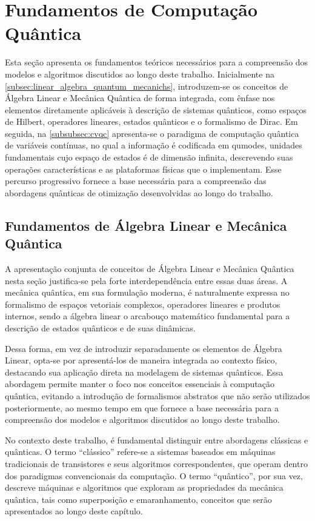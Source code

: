 \chapter{Fundamentos de Computação Quântica}\label{sec:quantum_mechanics}

Esta seção apresenta os fundamentos teóricos necessários para a compreensão dos modelos e algoritmos discutidos ao longo deste trabalho. Inicialmente na \autoref{subsec:linear_algebra_quantum_mecanichs}, introduzem-se os conceitos de Álgebra Linear e Mecânica Quântica de forma integrada, com ênfase nos elementos diretamente aplicáveis à descrição de sistemas quânticos, como espaços de Hilbert, operadores lineares, estados quânticos e o formalismo de Dirac. Em seguida, na \autoref{subsubsec:cvqc} apresenta-se o paradigma de computação quântica de variáveis contínuas, no qual a informação é codificada em qumodes, unidades fundamentais cujo espaço de estados é de dimensão infinita, descrevendo suas operações características e as plataformas físicas que o implementam. Esse percurso progressivo fornece a base necessária para a compreensão das abordagens quânticas de otimização desenvolvidas ao longo do trabalho.

\section{Fundamentos de Álgebra Linear e Mecânica Quântica}\label{subsec:linear_algebra_quantum_mecanichs}

A apresentação conjunta de conceitos de Álgebra Linear e Mecânica Quântica nesta seção justifica-se pela forte interdependência entre essas duas áreas. A mecânica quântica, em sua formulação moderna, é naturalmente expressa no formalismo de espaços vetoriais complexos, operadores lineares e produtos internos, sendo a álgebra linear o arcabouço matemático fundamental para a descrição de estados quânticos e de suas dinâmicas.

Dessa forma, em vez de introduzir separadamente os elementos de Álgebra Linear, opta-se por apresentá-los de maneira integrada ao contexto físico, destacando sua aplicação direta na modelagem de sistemas quânticos. Essa abordagem permite manter o foco nos conceitos essenciais à computação quântica, evitando a introdução de formalismos abstratos que não serão utilizados posteriormente, ao mesmo tempo em que fornece a base necessária para a compreensão dos modelos e algoritmos discutidos ao longo deste trabalho.

No contexto deste trabalho, é fundamental distinguir entre abordagens clássicas e quânticas. O termo ``clássico'' refere-se a sistemas baseados em máquinas tradicionais de transistores e seus algoritmos correspondentes, que operam dentro dos paradigmas convencionais da computação. O termo ``quântico'', por sua vez, descreve máquinas e algoritmos que exploram as propriedades da mecânica quântica, tais como superposição e emaranhamento, conceitos que serão apresentados ao longo deste capítulo.

